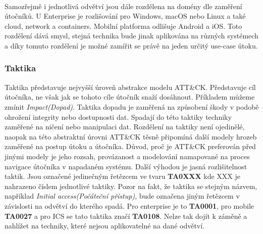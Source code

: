 \paragraph{}
Samozřejmě i jednotlivá odvětví jsou dále rozdělena na domény dle zaměření útočníků.
U Enterprise je rozlišování pro Windows, macOS nebo Linux a také cloud, network a containers.
Mobilní platforma odlišuje Android a iOS\@.
Toto rozdělení dává smysl, stejná technika bude jinak aplikována na různých systémech a díky tomuto rozdělení je možné zamířit se právě na jeden určitý use-case útoku.

\subsubsection{Taktika}
Taktika představuje nejvyšší úroveň abstrakce modelu ATT\&CK\@.
Představuje cíl útočníka, ne však jak se tohoto cíle útočník snaží dosáhnout.
Příkladem můžeme zmínit \textit{Impact(Dopad)}.
Taktika dopadu je zaměřená na způsobení škody v podobě ohrožení integrity nebo dostupnosti dat.
Spadají do této taktiky techniky zaměřené na ničení nebo manipulaci dat.
Rozdělení na taktiky není ojedinělé, naopak na této abstraktní úrovni ATT\&CK těsně připomíná další modely hrozeb zaměřené na postup útoku a útočníka.
Důvod, proč je ATT\&CK preferován před jinými modely je jeho rozsah, provázanost a modelování namapované na proces navigace útočníka v napadaném systému.
Další výhodou je jasná rozlišitelnost taktik.
Jsou označené jedinečným řetězcem ve tvaru \textbf{TA0XXX} kde XXX je nahrazeno číslem jednotlivé taktiky.
Pozor na fakt, že taktika se stejným názvem, například \textit{Initial access(Počáteční přístup)}, bude označena jiným řetězcem v závislosti na odvětví do kterého spadá.
Pro enterprise je to \textbf{TA0001}, pro mobile \textbf{TA0027} a pro ICS se tato taktika značí \textbf{TA0108}.
Nelze tak dojít k záměně a nahlížet na techniky, které nejsou aplikovatelné na dané odvětví.\cite{Mitre_finding_cyber_threats, mitre_attack_framework}


